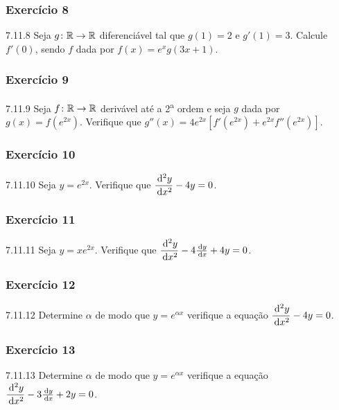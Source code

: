 \subsubsection*{Exercício 8}
\begin{exercicio}[8]{7.11.8}
Seja $g\colon \mathbb{R} \to \mathbb{R}$ diferenciável tal que $g(1) = 2$ e $g'(1) = 3$. Calcule $f'(0)$, sendo $f$ dada por $f(x) = e^x g(3x + 1)$.
\end{exercicio}

\subsubsection*{Exercício 9}
\begin{exercicio}[9]{7.11.9}
Seja $f\colon \mathbb{R} \to \mathbb{R}$ derivável até a 2\textsuperscript{a} ordem e seja $g$ dada por $g(x) = f(e^{2x})$. Verifique que $g''(x) = 4e^{2x}[f'(e^{2x}) + e^{2x}f''(e^{2x})]$.
\end{exercicio}

\subsubsection*{Exercício 10}
\begin{exercicio}[10]{7.11.10}
Seja $y = e^{2x}$. Verifique que $\dfrac{\,\mathrm{d}^2 y}{\,\mathrm{d} x^2} - 4y = 0$.
\end{exercicio}

\subsubsection*{Exercício 11}
\begin{exercicio}[11]{7.11.11}
Seja $y = xe^{2x}$. Verifique que $\dfrac{\,\mathrm{d}^2 y}{\,\mathrm{d} x^2} - 4\frac{\,\mathrm{d} y}{\,\mathrm{d} x} + 4y = 0$.
\end{exercicio}

\subsubsection*{Exercício 12}
\begin{exercicio}[12]{7.11.12}
Determine $\alpha$ de modo que $y = e^{\alpha x}$ verifique a equação $\dfrac{\,\mathrm{d}^2 y}{\,\mathrm{d} x^2} - 4y = 0$.
\end{exercicio}

\subsubsection*{Exercício 13}
\begin{exercicio}[13]{7.11.13}
Determine $\alpha$ de modo que $y = e^{\alpha x}$ verifique a equação $\dfrac{\,\mathrm{d}^2 y}{\,\mathrm{d} x^2} - 3\frac{\,\mathrm{d} y}{\,\mathrm{d} x} + 2y = 0$.
\end{exercicio}

